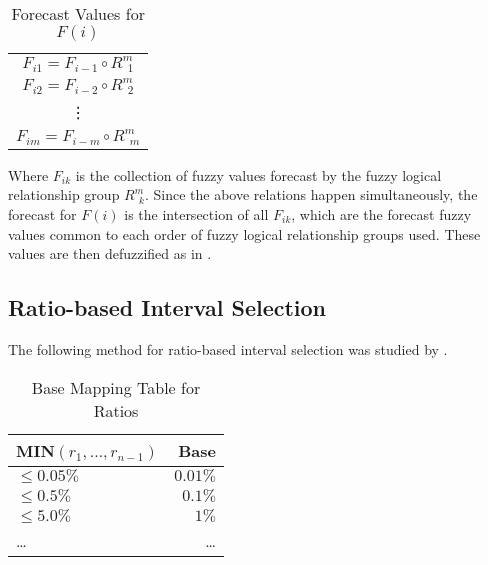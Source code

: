 \documentclass{article}
\theoremstyle{definition}
\begin{document}
\begin{table}[H]
	\center
	\begin{tabular}{ c }
  	$F_{i1} = F_{i-1} \circ R^{m}_{\ \ 1}$ \\
  	$F_{i2} = F_{i-2} \circ R^{m}_{\ \ 2}$ \\
  	\vdots \\
  	$F_{im} = F_{i-m} \circ R^{m}_{\ \ m}$ \\
	\end{tabular}
	\caption{Forecast Values for $F(i)$}
\end{table}

Where $F_{ik}$ is the collection of fuzzy values forecast by the fuzzy logical relationship group $R^{m}_{\ \ k}$. Since the above relations happen simultaneously, the forecast for $F(i)$ is the intersection of all $F_{ik}$, which are the forecast fuzzy values common to each order of fuzzy logical relationship groups used. These values are then defuzzified as in .

\subsection{Ratio-based Interval Selection}

The following method for ratio-based interval selection was studied by \cite{huarng2006ratio}.

\begin{table}[H]
	\center
	\begin{tabularx}{0.5\textwidth}{ X R }
  	MIN$(r_1,\ldots,r_{n-1})$ & Base\\
  	\hline 
  	\noalign{\smallskip}
	$\leq 0.05\%$ & $0.01\%$ \\
	$\leq 0.5\%$ & $0.1\%$ \\
	$\leq 5.0\%$ & $1\%$ \\
	\ldots & \ldots
	\end{tabularx}
	\caption{Base Mapping Table for Ratios}
\end{table}
\end{document}
